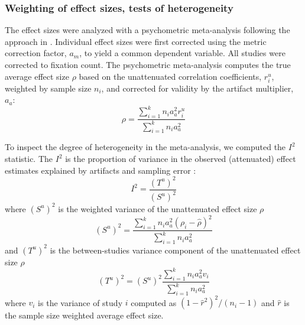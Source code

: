 \subsubsection{Weighting of effect sizes, tests of heterogeneity}

The effect sizes were analyzed with a psychometric meta-analysis following the approach in \cite{hunter2004a}. Individual effect sizes were first corrected using the metric correction factor, $a_m$, to yield a common dependent variable. All studies were corrected to fixation count. The psychometric meta-analysis computes the true average effect size $\rho$ based on the unattenuated correlation coefficients, $r_i^u$, weighted by sample size $n_i$, and corrected for validity by the artifact multiplier, $a_a$: 
%
\begin{equation}
\label{eq:psychometric_rho}
\rho = \frac{\sum_{i=1}^k n_i a_a^2 r_i^u}{\sum_{i=1}^k n_i a_a^2}
\end{equation}

To inspect the degree of heterogeneity in the meta-analysis, we computed the $I^2$ statistic. The $I^2$ is the proportion of variance in the observed (attenuated) effect estimates explained by artifacts and sampling error \citep{borenstein2011introduction}: 
%
\begin{equation}
\label{eq:i2_statistic}
I^2 = \frac{(T^u)^2}{(S^u)^2}
\end{equation}
%
where $(S^u)^2$ is the weighted variance of the unattenuated effect size $\rho$
%
\begin{equation}
\label{eq:Su2_var}
(S^u)^2 = \frac{\sum_{i=1}^k n_i a_a^2 (\rho_i - \hat{\rho})^2}{\sum_{i=1}^k n_i a_a^2}
\end{equation}
%
and $(T^u)^2$ is the between-studies variance component of the unattenuated effect size $\rho$
%
\begin{equation}
\label{eq:Tu2_var}
(T^u)^2 = (S^u)^2 \frac{\sum_{i=1}^k n_i a_a^2 v_i}{\sum_{i=1}^k n_i a_a^2}
\end{equation}
%
where $v_i$ is the variance of study $i$ computed as $(1 - \hat{r}^2)^2 / (n_i - 1)$ and $\hat{r}$ is the sample size weighted average effect size.
